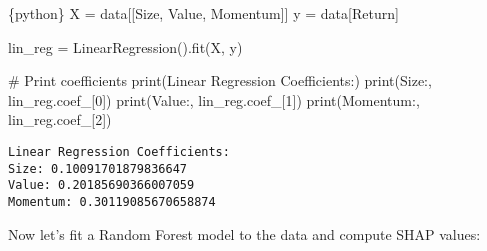 \documentclass[
  letterpaper,
  DIV=11,
  numbers=noendperiod]{scrartcl}
\newenvironment{Shaded}{\begin{snugshade}}{\end{snugshade}}
\newcommand{\BuiltInTok}[1]{\textcolor[rgb]{0.00,0.23,0.31}{#1}}
\newcommand{\CommentTok}[1]{\textcolor[rgb]{0.37,0.37,0.37}{#1}}
\newcommand{\DecValTok}[1]{\textcolor[rgb]{0.68,0.00,0.00}{#1}}
\newcommand{\InformationTok}[1]{\textcolor[rgb]{0.37,0.37,0.37}{#1}}
\newcommand{\NormalTok}[1]{\textcolor[rgb]{0.00,0.23,0.31}{#1}}
\newcommand{\OperatorTok}[1]{\textcolor[rgb]{0.37,0.37,0.37}{#1}}
\newcommand{\StringTok}[1]{\textcolor[rgb]{0.13,0.47,0.30}{#1}}
\begin{document}
\begin{Shaded}
\begin{Highlighting}[]
\InformationTok{\textasciigrave{}\textasciigrave{}\textasciigrave{}\{python\}}
\NormalTok{X }\OperatorTok{=}\NormalTok{ data[[}\StringTok{\textquotesingle{}Size\textquotesingle{}}\NormalTok{, }\StringTok{\textquotesingle{}Value\textquotesingle{}}\NormalTok{, }\StringTok{\textquotesingle{}Momentum\textquotesingle{}}\NormalTok{]]}
\NormalTok{y }\OperatorTok{=}\NormalTok{ data[}\StringTok{\textquotesingle{}Return\textquotesingle{}}\NormalTok{]}

\NormalTok{lin\_reg }\OperatorTok{=}\NormalTok{ LinearRegression().fit(X, y)}

\CommentTok{\# Print coefficients}
\BuiltInTok{print}\NormalTok{(}\StringTok{\textquotesingle{}Linear Regression Coefficients:\textquotesingle{}}\NormalTok{)}
\BuiltInTok{print}\NormalTok{(}\StringTok{\textquotesingle{}Size:\textquotesingle{}}\NormalTok{, lin\_reg.coef\_[}\DecValTok{0}\NormalTok{])}
\BuiltInTok{print}\NormalTok{(}\StringTok{\textquotesingle{}Value:\textquotesingle{}}\NormalTok{, lin\_reg.coef\_[}\DecValTok{1}\NormalTok{])}
\BuiltInTok{print}\NormalTok{(}\StringTok{\textquotesingle{}Momentum:\textquotesingle{}}\NormalTok{, lin\_reg.coef\_[}\DecValTok{2}\NormalTok{])}
\InformationTok{\textasciigrave{}\textasciigrave{}\textasciigrave{}}
\end{Highlighting}
\end{Shaded}

\begin{verbatim}
Linear Regression Coefficients:
Size: 0.10091701879836647
Value: 0.20185690366007059
Momentum: 0.30119085670658874
\end{verbatim}

Now let's fit a Random Forest model to the data and compute SHAP values:
\end{document}
